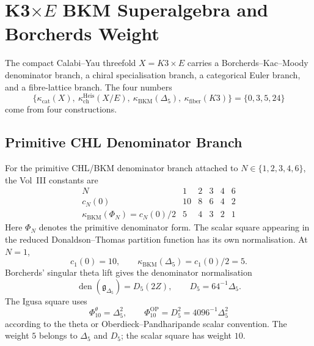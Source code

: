 
\providecommand{\kBKM}{\kappa_{\mathrm{BKM}}}
\providecommand{\kch}{\kappa_{\mathrm{ch}}}
\providecommand{\kcat}{\kappa_{\mathrm{cat}}}
\providecommand{\kfib}{\kappa_{\mathrm{fiber}}}
\providecommand{\Sp}{\mathrm{Sp}}
\providecommand{\OO}{\mathrm{O}}
\providecommand{\fg}{\mathfrak{g}}
\providecommand{\fn}{\mathfrak{n}}
\providecommand{\cO}{\mathcal{O}}
\providecommand{\CoHA}{\mathrm{CoHA}}
\providecommand{\mult}{\mathrm{mult}}
\providecommand{\Dfive}{D_5}
\providecommand{\Phiten}{\Phi_{10}}

\section*{K3$\times E$ BKM Superalgebra and Borcherds Weight}
\label{sec:kazhdan-K3E-BKM}

The compact Calabi--Yau threefold $X=K3\times E$ carries a
Borcherds--Kac--Moody denominator branch, a chiral specialisation
branch, a categorical Euler branch, and a fibre-lattice branch. The
four numbers
\[
  \{\kcat(X),\ \kch^{\mathrm{Heis}}(X/E),\
  \kBKM(\Delta_5),\ \kfib(K3)\}
  =
  \{0,3,5,24\}
\]
come from four constructions.

\subsection*{Primitive CHL Denominator Branch}

For the primitive CHL/BKM denominator branch attached to
$N\in\{1,2,3,4,6\}$, the Vol~III constants are
\[
\begin{array}{c|ccccc}
N & 1 & 2 & 3 & 4 & 6 \\ \hline
c_N(0) & 10 & 8 & 6 & 4 & 2 \\
\kBKM(\Phi_N)=c_N(0)/2 & 5 & 4 & 3 & 2 & 1
\end{array}
\]
Here $\Phi_N$ denotes the primitive denominator form. The scalar square
appearing in the reduced Donaldson--Thomas partition function has its
own normalisation.
At $N=1$,
\[
  c_1(0)=10,\qquad
  \kBKM(\Delta_5)=c_1(0)/2=5.
\]
Borcherds' singular theta lift gives the denominator normalisation
\[
  \operatorname{den}(\fg_{\Delta_5})=\Dfive(2Z),\qquad
  \Dfive=64^{-1}\Delta_5.
\]
The Igusa square uses
\[
  \Phiten^{\theta}=\Delta_5^2,\qquad
  \Phiten^{\mathrm{OP}}=\Dfive^2=4096^{-1}\Delta_5^2
\]
according to the theta or Oberdieck--Pandharipande scalar convention.
The weight $5$ belongs to $\Delta_5$ and $\Dfive$; the scalar square has
weight $10$.

